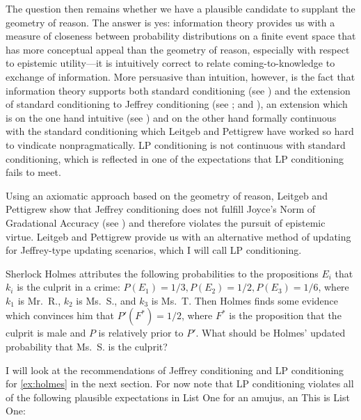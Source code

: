 \documentclass[11pt]{article}
\begin{document}
The question then remains whether we have a plausible candidate to
supplant the geometry of reason. The answer is yes: information theory
provides us with a measure of closeness between probability
distributions on a finite event space that has more conceptual appeal
than the geometry of reason, especially with respect to epistemic
utility---it is intuitively correct to relate coming-to-knowledge to
exchange of information. More persuasive than intuition, however, is
the fact that information theory supports both standard conditioning
(see ) and the extension of standard
conditioning to Jeffrey conditioning (see
; and ), an extension
which is on the one hand intuitive (see ) and on
the other hand formally continuous with the standard conditioning
which Leitgeb and Pettigrew have worked so hard to vindicate
nonpragmatically. LP conditioning is not continuous with standard
conditioning, which is reflected in one of the expectations that LP
conditioning fails to meet.

Using an axiomatic approach based on the geometry of reason, Leitgeb
and Pettigrew show that Jeffrey conditioning does not fulfill Joyce's
Norm of Gradational Accuracy (see ) and
therefore violates the pursuit of epistemic virtue. Leitgeb and
Pettigrew provide us with an alternative method of updating for
Jeffrey-type updating scenarios, which I will call LP conditioning.

\begin{quotex}
  \label{ex:holmes} Sherlock Holmes
  attributes the following probabilities to the propositions $E_{i}$
  that $k_{i}$ is the culprit in a crime:
  $P(E_{1})=1/3,P(E_{2})=1/2,P(E_{3})=1/6$, where $k_{1}$ is Mr.\ R.,
  $k_{2}$ is Ms.\ S., and $k_{3}$ is Ms.\ T. Then Holmes finds some
  evidence which convinces him that $P'(F^{*})=1/2$, where $F^{*}$ is
  the proposition that the culprit is male and $P$ is relatively prior
  to $P'$. What should be Holmes' updated probability that Ms.\ S. is
  the culprit?
\end{quotex}

I will look at the recommendations of Jeffrey conditioning and LP
conditioning for {\xample} \ref{ex:holmes} in the next section. For
now note that LP conditioning violates all of the following plausible
expectations in List One\label{page:listone} for an amujus, an
 This is List One:
\end{document}
